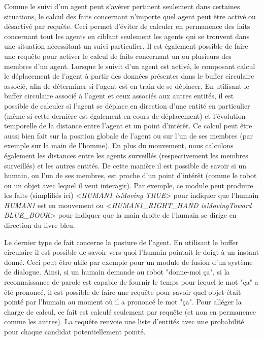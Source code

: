 \documentclass[a4paper,11pt,twoside]{StyleThese}
\begin{document}
Comme le suivi d'un agent peut s'avérer pertinent seulement dans certaines situations, le calcul des faits concernant n'importe quel agent peut être activé ou désactivé par requête. Ceci permet d'éviter de calculer en permanence des faits concernant tout les agents en ciblant seulement les agents qui se trouvent dans une situation nécessitant un suivi particulier.
Il est également possible de faire une requête pour activer le calcul de faits concernant un ou plusieurs des membres d'un agent. Lorsque le suivit d'un agent est activé, le composant calcul le déplacement de l'agent à partir des données présentes dans le buffer circulaire associé, afin de déterminer si l'agent est en train de se déplacer. En utilisant le buffer circulaire associé à l'agent et ceux associés aux autres entités, il est possible de calculer si l'agent se déplace en direction d'une entité en particulier (même si cette dernière est également en cours de déplacement) et l'évolution temporelle de la distance entre l'agent et un point d'intérêt. Ce calcul peut être aussi bien fait sur la position globale de l'agent ou sur l'un de ses membres (par exemple sur la main de l'homme).
En plus du mouvement, nous calculons également les distances entre les agents surveillés (respectivement les membres surveillés) et les autres entités.
De cette manière il est possible de savoir si un humain, ou l'un de ses membres, est proche d'un point d'intérêt (comme le robot ou un objet avec lequel il veut interagir).
Par exemple, ce module peut produire les faits (simplifiés ici) <\textit{HUMAN1 isMoving TRUE}> pour indiquer que l'humain \textit{HUMAN1} est en mouvement ou <\textit{HUMAN1\_RIGHT\_HAND isMovingToward BLUE\_BOOK}> pour indiquer que la main droite de l'humain se dirige en direction du livre bleu.

Le dernier type de fait concerne la posture de l'agent. En utilisant le buffer circulaire il est possible de savoir vers quoi l'humain pointait le doigt à un instant donné. Ceci peut être utile par exemple pour un module de fusion d'un système de dialogue. Ainsi, si un humain demande au robot "donne-moi ça", si la reconnaissance de parole est capable de fournir le temps pour lequel le mot "ça" a été prononcé, il est possible de faire une requête pour savoir quel objet était pointé par l'humain au moment où il a prononcé le mot "ça". Pour alléger la charge de calcul, ce fait est calculé seulement par requête (et non en permanence comme les autres). La requête renvoie une liste d'entités avec une probabilité pour chaque candidat potentiellement pointé.
\end{document}
